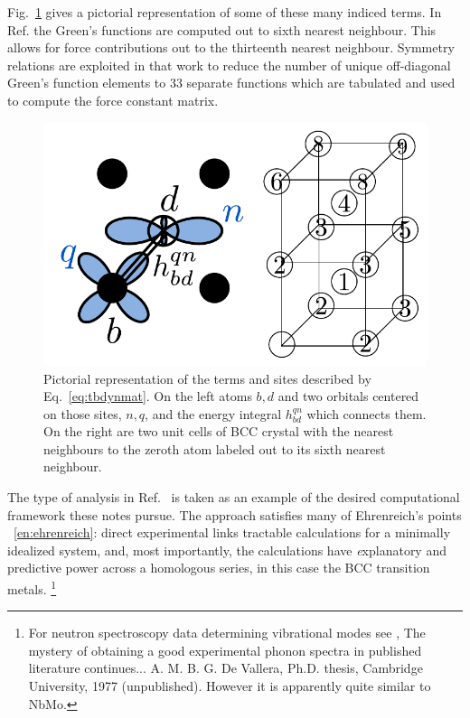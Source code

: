 Fig.~\ref{fig:tbresponse} gives a pictorial representation of some of these many indiced terms. In 
Ref.\cite{finnis84} the Green's functions are computed out to sixth nearest neighbour. This allows
for force contributions out to the thirteenth nearest neighbour. Symmetry relations are exploited 
in that work to reduce the number of unique off-diagonal Green's function elements to 
33 separate functions which are tabulated and used to compute the force constant matrix. 
%
\begin{figure}
\begin{center}
\includegraphics[scale=0.8]{./invariance/tbresponse.pdf}
\caption{Pictorial representation of the terms and sites described by Eq.~\ref{eq:tbdynmat}.
On the left atoms $b,d$ and two orbitals centered on those sites, $n, q$, and the energy
integral $h_{bd}^{qn}$ which connects them. On the right are two unit cells
of BCC crystal with the nearest neighbours to the zeroth atom labeled out to its sixth nearest
neighbour.\label{fig:tbresponse}}
\end{center}
\end{figure}
 

The type of analysis in Ref.~\cite{finnis84} is taken as an example
of the desired computational framework these notes pursue. 
The approach satisfies many of Ehrenreich's points ~\ref{en:ehrenreich}: 
direct experimental links 
tractable calculations for a minimally idealized system, and, most importantly, 
the calculations have {\emph explanatory and predictive power 
across a homologous series}, in this case the BCC transition metals.
\footnote{For neutron spectroscopy data determining vibrational modes 
see \cite{powell68, colella70, shaw71}, The mystery of obtaining a 
good experimental phonon spectra in published literature continues... 
A. M. B. G. De Vallera, Ph.D. thesis, Cambridge University, 1977 (unpublished).
However it is apparently quite similar to NbMo\cite{powerll68}.}


